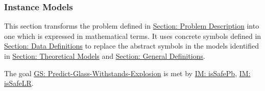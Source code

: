 \documentclass[12pt]{article}
\begin{document}
\subsubsection{Instance Models}
\label{Sec:IMs}
This section transforms the problem defined in \hyperref[Sec:ProbDesc]{Section: Problem Description} into one which is expressed in mathematical terms. It uses concrete symbols defined in \hyperref[Sec:DDs]{Section: Data Definitions} to replace the abstract symbols in the models identified in \hyperref[Sec:TMs]{Section: Theoretical Models} and \hyperref[Sec:GDs]{Section: General Definitions}.

The goal \hyperref[willBreakGS]{GS: Predict-Glass-Withstands-Explosion} is met by \hyperref[IM:isSafePb]{IM: isSafePb}, \hyperref[IM:isSafeLR]{IM: isSafeLR}.

\vspace{\baselineskip}
\noindent
\end{document}
